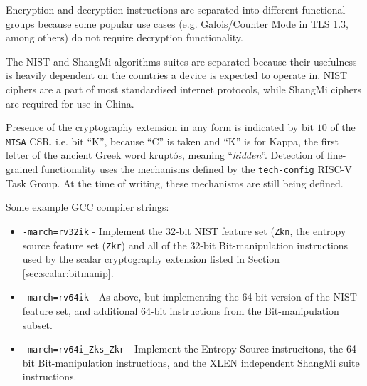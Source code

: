 Encryption and decryption instructions are separated into different functional
groups because some popular use cases (e.g. Galois/Counter Mode in TLS 1.3, among others)
do not require decryption functionality.

The NIST and ShangMi algorithms suites are separated because their usefulness is
heavily dependent on the countries a device is expected to operate in.
NIST ciphers are a part of most standardised internet protocols, while ShangMi ciphers are
required for use in China.

Presence of the cryptography extension in any form is indicated
by bit $10$ of the {\tt MISA} CSR.
i.e. bit ``K'', because ``C'' is taken and ``K'' is for Kappa, the
first letter of the ancient Greek word kruptós,
meaning ``{\em hidden}''.
Detection of fine-grained functionality uses the mechanisms defined
by the {\tt tech-config} RISC-V Task Group.
At the time of writing, these mechanisms are still being defined.

Some example GCC compiler strings:
\begin{itemize}
\item {\tt -march=rv32ik} -
    Implement the 32-bit NIST feature set ({\tt Zkn},
    the entropy source feature set ({\tt Zkr}) and
    all of the 32-bit Bit-manipulation instructions used by the
    scalar cryptography extension listed in Section \ref{sec:scalar:bitmanip}.
\item {\tt -march=rv64ik} -
    As above, but implementing the 64-bit version of the NIST feature set,
    and additional 64-bit instructions from the Bit-manipulation subset.
\item {\tt -march=rv64i\_Zks\_Zkr} -
    Implement the Entropy Source instrucitons,
    the 64-bit Bit-manipulation instructions,
    and the XLEN independent ShangMi suite instructions.
\end{itemize}

